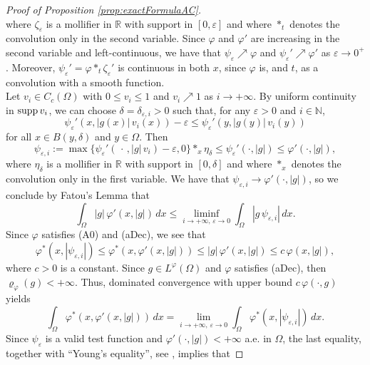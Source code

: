 \documentclass[a4paper,11pt,oneside,notitlepage]{article}
\numberwithin{equation}{section}
\def\R{\mathbb{R}}
\def\N{\mathbb{N}}
\def\supp{{\rm supp}}
\newcommand{\e}{\varepsilon}
\newcommand{\vphi}{\varphi}
\newcommand{\vrho}{\varrho}
\begin{document}
\begin{proof}[Proof of Proposition \ref{prop:exactFormulaAC}]
\begin{equation}
    \end{equation}
    where $\zeta_\e$ is a mollifier in $\R$ with support in $[0,\e]$ and where $*_t$ denotes the convolution only in the second variable. Since $\vphi$ and $\vphi'$ are increasing in the second variable and left-continuous, we have that $\psi_\e \nearrow \vphi$ and $\psi_\e' \nearrow \vphi'$ as $\e \to 0^+$. Moreover, $\psi_\e' = \vphi *_t \zeta_\e'$ is continuous in both $x$, since $\vphi$ is, and $t$, as a convolution with a smooth function.
    \\
    Let $v_i \in C_c(\Omega)$ with $0 \le v_i \le 1$ and $v_i \nearrow 1$ as $i \to +\infty$. By uniform continuity in $ \supp \, v_i$, we can choose $\delta = \delta_{\e, i} > 0$ such that, for any $\e > 0$ and $i \in \N$,
    \begin{equation*}
        \psi_\e'(x, |g(x)| \, v_i(x)) - \e \le \psi_\e'(y, |g(y)| \, v_i(y))
    \end{equation*}
    for all $x \in B(y,\delta)$ and $y \in \Omega$. Then
    \begin{equation*}
        \psi_{\e, i} := \max\{\psi_\e'(\,\cdot\,, |g| \, v_i) - \e, 0\} *_x \eta_\delta \le \psi_\e'(\cdot, |g|) \le \vphi'(\cdot, |g|),
    \end{equation*}
    where $\eta_\delta$ is a mollifier in $\R$ with support in $[0,\delta]$ and where $*_x$ denotes the convolution only in the first variable. We have that $\psi_{\e,i} \to \vphi'(\cdot, |g|)$, so we conclude by Fatou's Lemma that
    \begin{equation*}
        \int_\Omega |g| \, \vphi'(x, |g|) \, dx \le \liminf_{i \to +\infty, \, \e \to 0} \int_\Omega |g \, \psi_{\e, i}| \, dx.
    \end{equation*}
    Since $\vphi$ satisfies (A0) and (aDec), we see that
    \begin{equation*}
        \vphi^*(x, |\psi_{\e,i}|) \le \vphi^*(x, \vphi'(x, |g|)) \le |g| \, \vphi'(x, |g|) \le c \, \vphi(x, |g|),
    \end{equation*}
    where $c > 0$ is a constant. Since $g \in L^\vphi(\Omega)$ and $\vphi$ satisfies (aDec), then $\vrho_\vphi(g) < +\infty$. Thus, dominated convergence with upper bound $c \, \vphi(\cdot, g)$ yields
    \begin{equation*}
        \int_\Omega \vphi^*(x, \vphi'(x, |g|)) \, dx = \lim_{i \to +\infty, \, \e \to 0} \int_\Omega \vphi^*(x, |\psi_{\e,i}|) \, dx.
    \end{equation*}
    Since $\psi_\e$ is a valid test function and $\vphi'(\cdot, |g|) < +\infty$ a.e. in $\Omega$, the last equality, together with ``Young's equality'', see \cite[Lemma 1.7.3(i)]{NicP18}, implies that

\end{proof}
\end{document}
